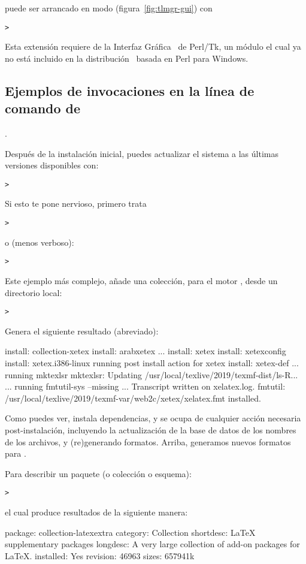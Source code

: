 \documentclass{article}
\begin{document}
 puede ser arrancado en modo \GUI{}
(figura~\ref{fig:tlmgr-gui}) con
\begin{alltt}
> 
\end{alltt}

Esta extensión requiere de la Interfaz Gráfica \GUI\ de
Perl/Tk, un módulo el cual ya no está incluido en la
distribución \TL\ basada en Perl para Windows.

\subsection{Ejemplos de invocaciones en la línea de comando de
}. 

Después de la instalación inicial, puedes actualizar el sistema a las
últimas versiones disponibles con: 
\begin{alltt}
> 
\end{alltt}
Si esto te pone nervioso, primero trata
\begin{alltt}
> 
\end{alltt}
o (menos verboso):
\begin{alltt}
> 
\end{alltt}

Este ejemplo más complejo, añade una colección, para el motor \XeTeX,
desde un directorio local:

\begin{alltt}
> 
\end{alltt}
Genera el siguiente resultado (abreviado):
\begin{fverbatim}
install: collection-xetex
install: arabxetex
...
install: xetex
install: xetexconfig
install: xetex.i386-linux
running post install action for xetex
install: xetex-def
...
running mktexlsr
mktexlsr: Updating /usr/local/texlive/2019/texmf-dist/ls-R...
...
running fmtutil-sys --missing
...
Transcript written on xelatex.log.
fmtutil: /usr/local/texlive/2019/texmf-var/web2c/xetex/xelatex.fmt installed.
\end{fverbatim}

Como puedes ver,  instala dependencias, y se ocupa de
cualquier acción necesaria post-instalación, incluyendo la
actualización de la base de datos de los nombres de los archivos, y
(re)generando formatos. Arriba, generamos nuevos formatos para \XeTeX.

Para describir un paquete (o colección o esquema):
\begin{alltt}
> 
\end{alltt}
el cual produce resultados de la siguiente manera:
\begin{fverbatim}
package:    collection-latexextra
category:   Collection
shortdesc:  LaTeX supplementary packages
longdesc:   A very large collection of add-on packages for LaTeX.
installed:  Yes
revision:   46963
sizes:      657941k
\end{fverbatim}
\end{document}
